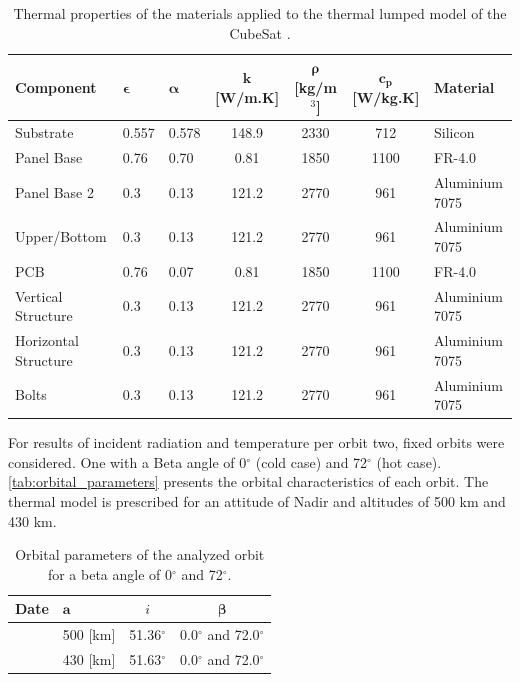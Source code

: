 \begin{table}[!ht]
    \centering
    \footnotesize
    \begin{tabular}{lllcccl}
        \toprule[1.5pt]
        \textbf{Component} & $\boldsymbol{\epsilon}$ & $\boldsymbol{\alpha}$ & \textbf{$\boldsymbol{k}$ [W/m.K]} & \textbf{$\boldsymbol{\rho}$ [kg/m$^{3}$]} & \textbf{$\boldsymbol{c_p}$ [W/kg.K]} & \textbf{Material} \\
        \midrule
        Substrate            & 0.557 & 0.578 & 148.9 & 2330 & 712  & Silicon \\
        Panel Base           & 0.76  & 0.70  & 0.81  & 1850 & 1100 & FR-4.0 \\
        Panel Base 2         & 0.3   & 0.13  & 121.2 & 2770 & 961  & Aluminium 7075 \\
        Upper/Bottom         & 0.3   & 0.13  & 121.2 & 2770 & 961  & Aluminium 7075 \\
        PCB                  & 0.76  & 0.07  & 0.81  & 1850 & 1100 & FR-4.0 \\
        Vertical Structure   & 0.3   & 0.13  & 121.2 & 2770 & 961  & Aluminium 7075 \\
        Horizontal Structure & 0.3   & 0.13  & 121.2 & 2770 & 961  & Aluminium 7075 \\
        Bolts                & 0.3   & 0.13  & 121.2 & 2770 & 961  & Aluminium 7075 \\
        \bottomrule[1.5pt]
    \end{tabular}
    \caption{Thermal properties of the materials applied to the thermal lumped model of the CubeSat \cite{COBEM-Cardozo}.}
    \label{tab:Thermal_parameters_2}
\end{table}

For results of incident radiation and temperature per orbit two, fixed orbits were considered. One with a Beta angle of 0$^\circ$ (cold case) and 72$^\circ$ (hot case). \autoref{tab:orbital_parameters} presents the orbital characteristics of each orbit. The thermal model is prescribed for an attitude of Nadir and altitudes of 500 km and 430 km.

\begin{table}[!ht]
    \centering
    \footnotesize
    \begin{tabular}{llcc}
        \toprule[1.5pt]
        \textbf{Date} & $\boldsymbol{a}$ & \textbf{$i$} & $\boldsymbol{\beta}$ \\
        \midrule
        \cite{COBEM-Cardozo} & 500 [km] & 51.36$^\circ$ & 0.0$^\circ$ and 72.0$^\circ$ \\
        \cite{gomes2022}     & 430 [km] & 51.63$^\circ$ & 0.0$^\circ$ and 72.0$^\circ$ \\
        \bottomrule[1.5pt]
    \end{tabular}
    \caption{Orbital parameters of the analyzed orbit for a beta angle of 0$^\circ$ and 72$^\circ$.}
    \label{tab:orbital_parameters}
\end{table}

